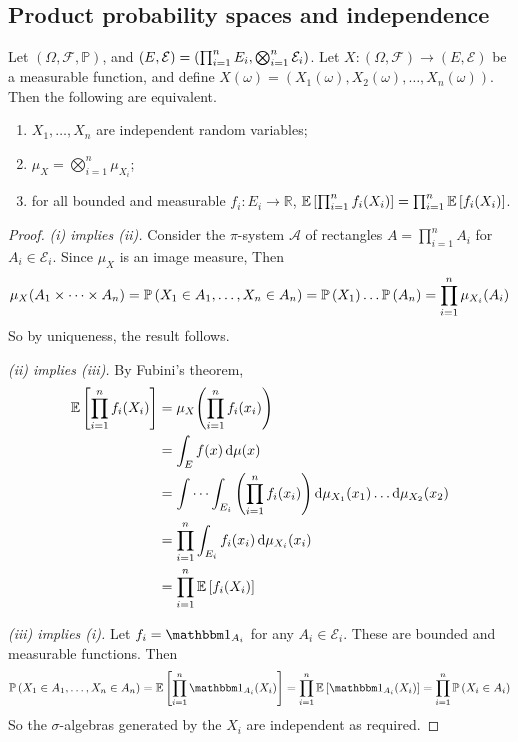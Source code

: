 \subsection{Product probability spaces and independence}
\begin{proposition}
	Let \( (\Omega, \mathcal F, \mathbb P) \), and \( (E, \mathcal E) = \qty(\prod_{i=1}^n E_i, \bigotimes_{i=1}^n \mathcal E_i) \).
	Let \( X \colon (\Omega, \mathcal F) \to (E, \mathcal E) \) be a measurable function, and define \( X(\omega) = (X_1(\omega), X_2(\omega), \dots, X_n(\omega)) \).
	Then the following are equivalent.
	\begin{enumerate}
		\item \( X_1, \dots, X_n \) are independent random variables;
		\item \( \mu_X = \bigotimes_{i=1}^n \mu_{X_i} \);
		\item for all bounded and measurable \( f_i \colon E_i \to \mathbb R \), \( \mathbb{E}\left[{\prod_{i=1}^n f_i(X_i)}\right] = \prod_{i=1}^n \mathbb{E}\left[{f_i(X_i)}\right] \).
	\end{enumerate}
\end{proposition}
\begin{proof}
	\emph{(i) implies (ii).}
	Consider the \( \pi \)-system \( \mathcal A \) of rectangles \( A = \prod_{i=1}^n A_i \) for \( A_i \in \mathcal E_i \).
	Since \( \mu_X \) is an image measure,
	Then
	\[ \mu_X(A_1 \times \dots \times A_n) = \mathbb{P}\left({X_1 \in A_1, \dots, X_n \in A_n}\right) = \mathbb{P}\left({X_1}\right) \dots \mathbb{P}\left({A_n}\right) = \prod_{i=1}^n \mu_{X_i}(A_i) \]
	So by uniqueness, the result follows.

	\emph{(ii) implies (iii).}
	By Fubini's theorem,
	\begin{align*}
		\mathbb{E}\left[{\prod_{i=1}^n f_i(X_i)}\right] &= \mu_X\qty(\prod_{i=1}^n f_i(x_i)) \\
		&= \int_E f(x) \dd{\mu(x)} \\
		&= \idotsint_{E_i} \qty(\prod_{i=1}^n f_i(x_i)) \dd{\mu_{X_1}(x_1)} \dots \dd{\mu_{X_2}(x_2)} \\
		&= \prod_{i=1}^n \int_{E_i} f_i(x_i) \dd{\mu_{X_i}(x_i)} \\
		&= \prod_{i=1}^n \mathbb{E}\left[{f_i(X_i)}\right]
	\end{align*}

	\emph{(iii) implies (i).}
	Let \( f_i = \mathbbm 1_{A_i} \) for any \( A_i \in \mathcal E_i \).
	These are bounded and measurable functions.
	Then
	\[ \prob{X_1 \in A_1, \dots, X_n \in A_n} = \expect{\prod_{i=1}^n \mathbbm 1_{A_i}(X_i)} = \prod_{i=1}^n \expect{\mathbbm 1_{A_i}(X_i)} = \prod_{i=1}^n \prob{X_i \in A_i} \]
	So the \( \sigma \)-algebras generated by the \( X_i \) are independent as required.
\end{proof}
